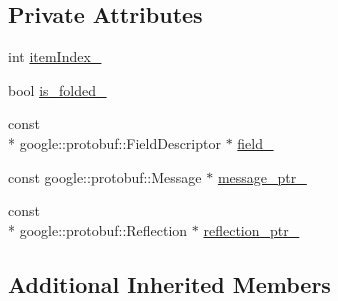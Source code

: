 \subsection*{Private Attributes}
\begin{DoxyCompactItemize}
\item 
int \hyperlink{classGeneralMessage_a5a14f5070ecf60e853ff57de0eb14cbe}{item\-Index\-\_\-}
\item 
bool \hyperlink{classGeneralMessage_aa4574eb1aa08869087923fadcc7c8ea1}{is\-\_\-folded\-\_\-}
\item 
const \\*
google\-::protobuf\-::\-Field\-Descriptor $\ast$ \hyperlink{classGeneralMessage_adde304145c9d3c9183ecdab343cecbcb}{field\-\_\-}
\item 
const google\-::protobuf\-::\-Message $\ast$ \hyperlink{classGeneralMessage_a2190da87b7dd7402133992d44fb98230}{message\-\_\-ptr\-\_\-}
\item 
const \\*
google\-::protobuf\-::\-Reflection $\ast$ \hyperlink{classGeneralMessage_ab56cddfdf8a104d774626dc1acd5f23d}{reflection\-\_\-ptr\-\_\-}
\end{DoxyCompactItemize}
\subsection*{Additional Inherited Members}


